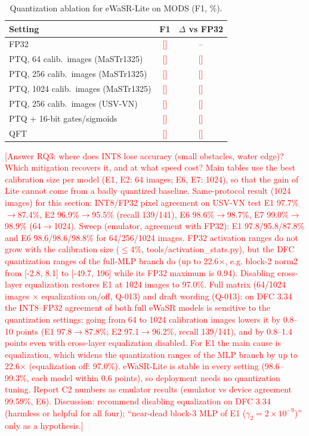 \documentclass[conference]{IEEEtran}
\newcommand{\tbd}[1]{\textcolor{red}{[#1]}}
\begin{document}
\begin{table}[t]
\centering
\caption{Quantization ablation for eWaSR-Lite on MODS (F1, \%).}
\label{tab:quant}
\begin{tabular}{lcc}
\toprule
Setting & F1 & $\Delta$ vs FP32 \\
\midrule
FP32                                  & \tbd{} & -- \\
PTQ, 64 calib.\ images (MaSTr1325)    & \tbd{} & \tbd{} \\
PTQ, 256 calib.\ images (MaSTr1325)   & \tbd{} & \tbd{} \\
PTQ, 1024 calib.\ images (MaSTr1325)  & \tbd{} & \tbd{} \\
PTQ, 256 calib.\ images (USV-VN)      & \tbd{} & \tbd{} \\
PTQ + 16-bit gates/sigmoids           & \tbd{} & \tbd{} \\
QFT                                   & \tbd{} & \tbd{} \\
\bottomrule
\end{tabular}
\end{table}
\tbd{Answer RQ3: where does INT8 lose accuracy (small obstacles, water edge)? Which mitigation recovers it, and at what speed cost? Main tables use the best calibration size per model (E1, E2: 64 images; E6, E7: 1024), so that the gain of Lite cannot come from a badly quantized baseline. Same-protocol result (1024 images) for this section: INT8/FP32 pixel agreement on USV-VN test E1 97.7\%$\to$87.4\%, E2 96.9\%$\to$95.5\% (recall 139/141), E6 98.6\%$\to$98.7\%, E7 99.0\%$\to$98.9\% (64$\to$1024). Sweep (emulator, agreement with FP32): E1 97.8/95.8/87.8\% and E6 98.6/98.6/98.8\% for 64/256/1024 images. FP32 activation ranges do not grow with the calibration size ($\le$4\%, tools/activation_stats.py), but the DFC quantization ranges of the full-MLP branch do (up to 22.6$\times$, e.g. block-2 norm2 from [-2.8, 8.1] to [-49.7, 196] while its FP32 maximum is 0.94). Disabling cross-layer equalization restores E1 at 1024 images to 97.0\%. Full matrix (64/1024 images $\times$ equalization on/off, Q-013) and draft wording (Q-013): on DFC 3.34 the INT8--FP32 agreement of both full eWaSR models is sensitive to the quantization settings: going from 64 to 1024 calibration images lowers it by 0.8--10 points (E1 97.8$\to$87.8\%; E2 97.1$\to$96.2\%, recall 139/141), and by 0.8--1.4 points even with cross-layer equalization disabled. For E1 the main cause is equalization, which widens the quantization ranges of the MLP branch by up to 22.6$\times$ (equalization off: 97.0\%). eWaSR-Lite is stable in every setting (98.6--99.3\%, each model within 0.6 points), so deployment needs no quantization tuning. Report C2 numbers as emulator results (emulator vs device agreement 99.59\%, E6). Discussion: recommend disabling equalization on DFC 3.34 (harmless or helpful for all four); ``near-dead block-3 MLP of E1 ($\gamma_2=2\times10^{-9}$)'' only as a hypothesis.}
\end{document}
